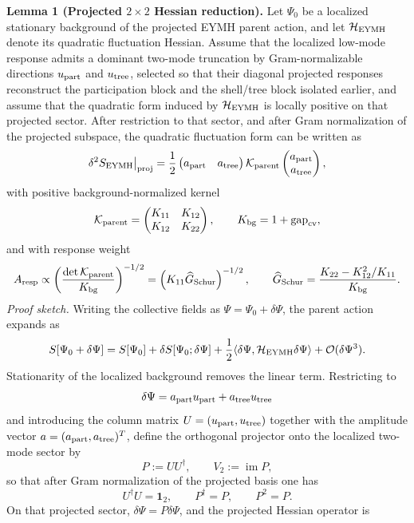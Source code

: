 \documentclass[aps,prd,onecolumn,notitlepage,nofootinbib,superscriptaddress,11pt,floatfix]{revtex4-2}
\begin{document}
\noindent\textbf{Lemma 1 (Projected \(2\times2\) Hessian reduction).}
Let \(\Psi_0\) be a localized stationary background of the projected EYMH parent action, and let \(\mathcal H_{\rm EYMH}\) denote its quadratic fluctuation Hessian. Assume that the localized low-mode response admits a dominant two-mode truncation by Gram-normalizable directions \(u_{\rm part}\) and \(u_{\rm tree}\), selected so that their diagonal projected responses reconstruct the participation block and the shell/tree block isolated earlier, and assume that the quadratic form induced by \(\mathcal H_{\rm EYMH}\) is locally positive on that projected sector. After restriction to that sector, and after Gram normalization of the projected subspace, the quadratic fluctuation form can be written as
\[
\delta^2 S_{\rm EYMH}\big|_{\rm proj}
=
\frac12
\begin{pmatrix}
a_{\rm part} & a_{\rm tree}
\end{pmatrix}
\mathcal K_{\rm parent}
\begin{pmatrix}
a_{\rm part} \\
a_{\rm tree}
\end{pmatrix},
\]
with positive background-normalized kernel
\[
\mathcal K_{\rm parent}
=
\begin{pmatrix}
K_{11} & K_{12}\\
K_{12} & K_{22}
\end{pmatrix},
\qquad
K_{\rm bg}=1+\mathrm{gap}_{\rm cv},
\]
and with response weight
\[
A_{\rm resp}\propto
\left(\frac{\det\mathcal K_{\rm parent}}{K_{\rm bg}}\right)^{-1/2}
=
\left(K_{11}\widehat G_{\rm Schur}\right)^{-1/2},
\qquad
\widehat G_{\rm Schur}
=
\frac{K_{22}-K_{12}^2/K_{11}}{K_{\rm bg}}.
\]
\emph{Proof sketch.}
Writing the collective fields as \(\Psi=\Psi_0+\delta\Psi\), the parent action expands as
\[
S[\Psi_0+\delta\Psi]
=
S[\Psi_0]
+\delta S[\Psi_0;\delta\Psi]
+\frac12\langle \delta\Psi,\mathcal H_{\rm EYMH}\delta\Psi\rangle
+\mathcal O(\delta\Psi^3).
\]
Stationarity of the localized background removes the linear term. Restricting to
\[
\delta\Psi=a_{\rm part}u_{\rm part}+a_{\rm tree}u_{\rm tree}
\]
and introducing the column matrix \(U=(u_{\rm part},u_{\rm tree})\) together with the amplitude vector \(a=(a_{\rm part},a_{\rm tree})^T\), define the orthogonal projector onto the localized two-mode sector by
\[
P:=UU^\dagger,
\qquad
V_2:=\operatorname{im}P,
\]
so that after Gram normalization of the projected basis one has
\[
U^\dagger U=\mathbf 1_2,
\qquad
P^\dagger=P,
\qquad
P^2=P.
\]
On that projected sector, \(\delta\Psi=P\delta\Psi\), and the projected Hessian operator is
\end{document}
